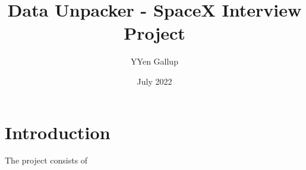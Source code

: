\documentclass{article}
\title{Data Unpacker - SpaceX Interview Project}
\author{YYen Gallup}
\date{July 2022}
\begin{document}
\maketitle

\tableofcontents

\section{Introduction}
The project consists of 
\end{document}
